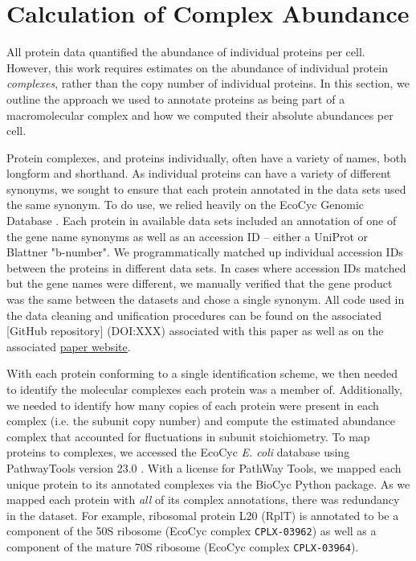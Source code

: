 \section{Calculation of Complex Abundance}

All protein data quantified the abundance of individual proteins per cell.
However, this work requires estimates on the abundance of individual protein
\textit{complexes}, rather than the copy number of individual proteins. In this
section, we outline the approach we used to annotate proteins as being part of
a macromolecular complex and how we computed their absolute abundances per cell.

Protein complexes, and proteins individually, often have a variety of names,
both longform and shorthand. As individual proteins can have a variety of
different synonyms, we sought to ensure that each protein annotated in the
data sets used the same synonym. To do use, we relied heavily on the EcoCyc
Genomic Database \citep{keseler2017}.  Each protein in available data sets
included an annotation of one of the gene name synonyms as well as an
accession ID -- either a UniProt or Blattner "b-number". We programmatically
matched up individual accession IDs between the proteins in different data sets.
In cases where accession IDs matched but the gene names were different, we
manually verified that the gene product was the same between the datasets and
chose a single synonym.  All code used  in the data cleaning and unification
procedures can be found on the associated
\href{https://github.com/rpgroup-pboc/growth_limits}[GitHub repository]
(DOI:XXX) associated with this paper as well as on the associated
\href{https://rpgroup.caltech.edu/growth_limits}{paper website}.

With each protein conforming to a single identification
scheme, we then needed to identify the molecular complexes each protein was a
member of. Additionally, we needed to identify how many copies of each protein
were present in each complex (i.e. the subunit copy number) and compute the
estimated abundance complex that accounted for fluctuations in subunit
stoichiometry. To map proteins to complexes, we accessed the
EcoCyc \textit{E. coli} database \cite{keseler2017} using PathwayTools version
23.0 \cite{karp2019}. With a license for PathWay Tools, we
mapped each unique protein to its annotated complexes via the
BioCyc Python package. As we mapped each protein with \textit{all} of its
complex annotations, there was redundancy in the dataset. For example, ribosomal
protein L20 (RplT) is annotated to be a component of the 50S ribosome (EcoCyc
complex \texttt{CPLX-03962}) as well as a component of the mature 70S ribosome
(EcoCyc complex \texttt{CPLX-03964}).


